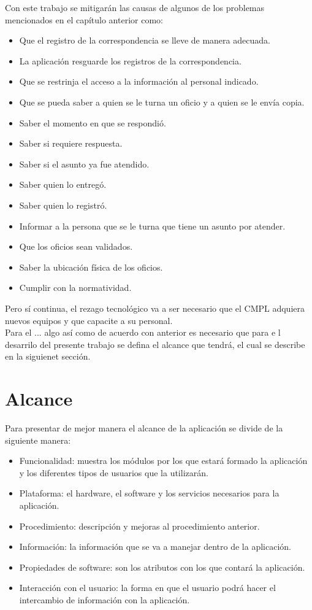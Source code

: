 Con este trabajo se mitigarán las causas de algunos de los problemas mencionados en el capítulo anterior como: 
\begin{itemize}
	\item Que el registro de la correspondencia se lleve de manera adecuada.
	\item La aplicación resguarde los registros de la correspondencia.
	\item Que se restrinja el acceso a la información al personal indicado.
	\item Que se pueda saber a quien se le turna un oficio y a quien se le envía copia.
	\item Saber el momento en que se respondió.
	\item Saber si requiere respuesta.
	\item Saber si el asunto ya fue atendido. 
	\item Saber quien lo entregó.
	\item Saber quien lo registró.
	\item Informar a la persona que se le turna que tiene un asunto por atender.
	\item Que los oficios sean validados.
	\item Saber la ubicación física de los oficios. 
	\item Cumplir con la normatividad.
\end{itemize}  
Pero sí continua, el rezago tecnológico va a ser necesario que el CMPL adquiera nuevos equipos y que capacite a su personal. \\

Para el ... algo así como de acuerdo con anterior es necesario que para e l desarrilo del presente trabajo se defina el alcance que tendrá, el cual se describe en la siguienet sección. 

\section{Alcance}

Para presentar de mejor manera el alcance de la aplicación se divide de la siguiente manera: \\

\begin{itemize}
	\item Funcionalidad: muestra los módulos por los que estará formado la aplicación y los diferentes tipos de usuarios que la utilizarán.
	\item Plataforma: el hardware, el software y los servicios necesarios para la aplicación.
	\item Procedimiento: descripción y mejoras al procedimiento anterior.
	\item Información: la información que se va a manejar dentro de la aplicación.
	\item Propiedades de software: son los atributos con los que contará la aplicación.
	\item Interacción con el usuario: la forma en que el usuario podrá hacer el intercambio de información con la aplicación.
\end{itemize}


